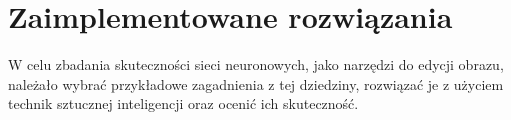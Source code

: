 \documentclass[10pt, a4paper, twoside, notitlepage, openright]{article}
\begin{document}






%
%
%
%
%

\setcounter{page}{2}




\newpage
  \tableofcontents









\section{Zaimplementowane rozwiązania}  \label{zaimplementowane rozwiazania}

  W celu zbadania skuteczności sieci neuronowych, jako narzędzi do edycji obrazu,
  należało wybrać przykładowe zagadnienia z tej dziedziny, rozwiązać je z
  użyciem technik sztucznej inteligencji oraz ocenić ich skuteczność.
\end{document}

